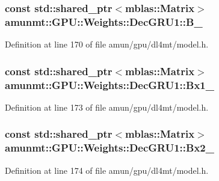 \subsubsection[{\texorpdfstring{B\+\_\+}{B_}}]{\setlength{\rightskip}{0pt plus 5cm}const std\+::shared\+\_\+ptr$<${\bf mblas\+::\+Matrix}$>$ amunmt\+::\+G\+P\+U\+::\+Weights\+::\+Dec\+G\+R\+U1\+::\+B\+\_\+}\hypertarget{structamunmt_1_1GPU_1_1Weights_1_1DecGRU1_aac42067db6e31af9de7156d8334b4f5c}{}\label{structamunmt_1_1GPU_1_1Weights_1_1DecGRU1_aac42067db6e31af9de7156d8334b4f5c}


Definition at line 170 of file amun/gpu/dl4mt/model.\+h.

\subsubsection[{\texorpdfstring{Bx1\+\_\+}{Bx1_}}]{\setlength{\rightskip}{0pt plus 5cm}const std\+::shared\+\_\+ptr$<${\bf mblas\+::\+Matrix}$>$ amunmt\+::\+G\+P\+U\+::\+Weights\+::\+Dec\+G\+R\+U1\+::\+Bx1\+\_\+}\hypertarget{structamunmt_1_1GPU_1_1Weights_1_1DecGRU1_a11590f59f67b93d7acf8d6acedd85716}{}\label{structamunmt_1_1GPU_1_1Weights_1_1DecGRU1_a11590f59f67b93d7acf8d6acedd85716}


Definition at line 173 of file amun/gpu/dl4mt/model.\+h.

\subsubsection[{\texorpdfstring{Bx2\+\_\+}{Bx2_}}]{\setlength{\rightskip}{0pt plus 5cm}const std\+::shared\+\_\+ptr$<${\bf mblas\+::\+Matrix}$>$ amunmt\+::\+G\+P\+U\+::\+Weights\+::\+Dec\+G\+R\+U1\+::\+Bx2\+\_\+}\hypertarget{structamunmt_1_1GPU_1_1Weights_1_1DecGRU1_a04bda56360f799f0641b3f4cf144e539}{}\label{structamunmt_1_1GPU_1_1Weights_1_1DecGRU1_a04bda56360f799f0641b3f4cf144e539}


Definition at line 174 of file amun/gpu/dl4mt/model.\+h.

